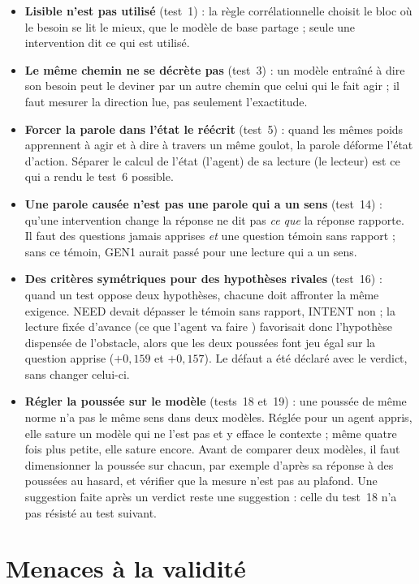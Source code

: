 \documentclass[11pt,a4paper]{article}
\begin{document}
\begin{itemize}
\item \textbf{Lisible n'est pas utilisé} (test~1) : la règle corrélationnelle
choisit le bloc où le besoin se lit le mieux, que le modèle de base partage ; seule
une intervention dit ce qui est utilisé.
\item \textbf{Le même chemin ne se décrète pas} (test~3) : un modèle entraîné à
dire son besoin peut le deviner par un autre chemin que celui qui le fait agir ;
il faut mesurer la direction lue, pas seulement l'exactitude.
\item \textbf{Forcer la parole dans l'état le réécrit} (test~5) : quand les mêmes
poids apprennent à agir et à dire à travers un même goulot, la parole déforme
l'état d'action. Séparer le calcul de l'état (l'agent) de sa lecture (le lecteur)
est ce qui a rendu le test~6 possible.
\item \textbf{Une parole causée n'est pas une parole qui a un sens} (test~14) : qu'une
intervention change la réponse ne dit pas \emph{ce que} la réponse rapporte. Il faut
des questions jamais apprises \emph{et} une question témoin sans rapport ; sans ce
témoin, GEN1 aurait passé pour une lecture qui a un sens.
\item \textbf{Des critères symétriques pour des hypothèses rivales} (test~16) : quand un
test oppose deux hypothèses, chacune doit affronter la même exigence. NEED devait dépasser
le témoin sans rapport, INTENT non ; la lecture fixée d'avance (\og ce que l'agent va
faire \fg{}) favorisait donc l'hypothèse dispensée de l'obstacle, alors que les deux
poussées font jeu égal sur la question apprise ($+0,159$ et $+0,157$). Le défaut a été déclaré avec le verdict, sans
changer celui-ci.
\item \textbf{Régler la poussée sur le modèle} (tests~18 et~19) : une poussée de même norme n'a
pas le même sens dans deux modèles. Réglée pour un agent appris, elle sature un modèle qui ne
l'est pas et y efface le contexte ; même quatre fois plus petite, elle sature encore. Avant de
comparer deux modèles, il faut dimensionner la poussée sur chacun, par exemple d'après sa
réponse à des poussées au hasard, et vérifier que la mesure n'est pas au plafond. Une
suggestion faite après un verdict reste une suggestion : celle du test~18 n'a pas résisté au
test suivant.
\end{itemize}

\section{Menaces à la validité}
\label{sec-menaces}
\end{document}
